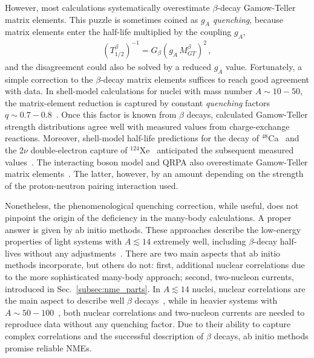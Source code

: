 However, most calculations systematically overestimate $\beta$-decay Gamow-Teller matrix elements. This puzzle is sometimes coined as {\it $g_A$ quenching}, because matrix elements enter the half-life multiplied by the coupling $g_A$,
\begin{align}
\left(T_{1/2}^\beta\right)^{-1} =  G_{\beta}\left(g_A\,M^{\beta}_{GT}\right)^2\,,
\label{eq:beta}
\end{align}
and the disagreement could also be solved by a reduced $g_A$ value. Fortunately, a simple correction to the $\beta$-decay matrix elements suffices to reach good agreement with data. In shell-model calculations for nuclei with mass number $A\sim10-50$, the matrix-element reduction is captured by constant {\it quenching} factors $q\sim 0.7-0.8$~\cite{Chou:1993zz,Wildenthal:1983zz,Martinez-Pinedo:1996zvt}. Once this factor is known from $\beta$ decays, calculated Gamow-Teller strength distributions agree well with measured values from charge-exchange reactions. Moreover, shell-model half-life predictions for the \bbtnu decay of $^{48}$Ca~\cite{Caurier:1990dc,Poves:1995rg} and the $2\nu$ double-electron capture of $^{124}$Xe~\cite{CoelloPerez:2018ghg} anticipated the subsequent measured values~\cite{Balysh:1996vr,XENON:2019dti}. The interacting boson model and QRPA also overestimate Gamow-Teller matrix elements~\cite{Barea:2015kwa,Pirinen:2015sma}. The latter, however, by an amount depending on the strength of the proton-neutron pairing interaction used.

Nonetheless, the phenomenological quenching correction, while useful, does not pinpoint the origin of the deficiency in the many-body calculations. A proper answer is given by ab initio methods. These approaches describe the low-energy properties of light systems with $A\lesssim 14$ extremely well, including $\beta$-decay half-lives without any adjustments~\cite{Pastore:2017uwc,Gysbers:2019uyb}. There are two main aspects that ab initio methods incorporate, but others do not: first, additional nuclear correlations due to the more sophisticated many-body approach; second, two-nucleon currents, introduced in Sec.~\ref{subsec:nme_parts}. In $A\lesssim 14$ nuclei, nuclear correlations are the main aspect to describe well $\beta$ decays~\cite{Pastore:2017uwc,King:2020wmp}, while in heavier systems with $A\sim50-100$~\cite{Gysbers:2019uyb}, both nuclear correlations and two-nucleon currents are needed to reproduce data without any quenching factor. Due to their ability to capture complex correlations and the successful description of $\beta$ decays, ab initio methods promise reliable \bbonu NMEs.

